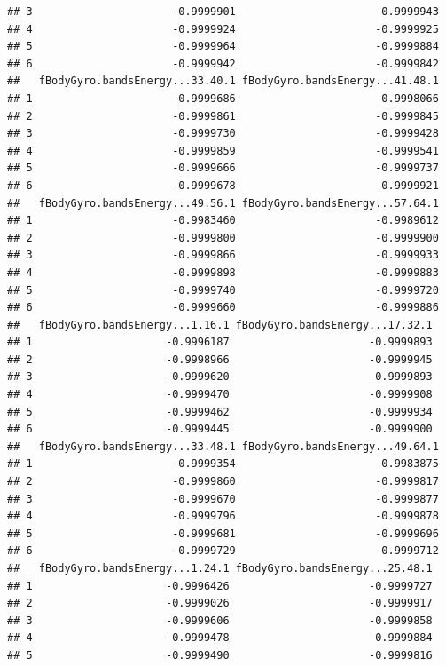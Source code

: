 \documentclass[
]{article}
\begin{document}
\begin{verbatim}
## 3                      -0.9999901                      -0.9999943
## 4                      -0.9999924                      -0.9999925
## 5                      -0.9999964                      -0.9999884
## 6                      -0.9999942                      -0.9999842
##   fBodyGyro.bandsEnergy...33.40.1 fBodyGyro.bandsEnergy...41.48.1
## 1                      -0.9999686                      -0.9998066
## 2                      -0.9999861                      -0.9999845
## 3                      -0.9999730                      -0.9999428
## 4                      -0.9999859                      -0.9999541
## 5                      -0.9999666                      -0.9999737
## 6                      -0.9999678                      -0.9999921
##   fBodyGyro.bandsEnergy...49.56.1 fBodyGyro.bandsEnergy...57.64.1
## 1                      -0.9983460                      -0.9989612
## 2                      -0.9999800                      -0.9999900
## 3                      -0.9999866                      -0.9999933
## 4                      -0.9999898                      -0.9999883
## 5                      -0.9999740                      -0.9999720
## 6                      -0.9999660                      -0.9999886
##   fBodyGyro.bandsEnergy...1.16.1 fBodyGyro.bandsEnergy...17.32.1
## 1                     -0.9996187                      -0.9999893
## 2                     -0.9998966                      -0.9999945
## 3                     -0.9999620                      -0.9999893
## 4                     -0.9999470                      -0.9999908
## 5                     -0.9999462                      -0.9999934
## 6                     -0.9999445                      -0.9999900
##   fBodyGyro.bandsEnergy...33.48.1 fBodyGyro.bandsEnergy...49.64.1
## 1                      -0.9999354                      -0.9983875
## 2                      -0.9999860                      -0.9999817
## 3                      -0.9999670                      -0.9999877
## 4                      -0.9999796                      -0.9999878
## 5                      -0.9999681                      -0.9999696
## 6                      -0.9999729                      -0.9999712
##   fBodyGyro.bandsEnergy...1.24.1 fBodyGyro.bandsEnergy...25.48.1
## 1                     -0.9996426                      -0.9999727
## 2                     -0.9999026                      -0.9999917
## 3                     -0.9999606                      -0.9999858
## 4                     -0.9999478                      -0.9999884
## 5                     -0.9999490                      -0.9999816

\end{verbatim}
\end{document}
